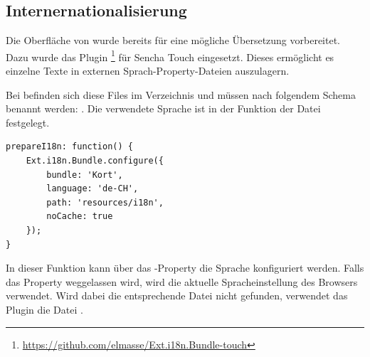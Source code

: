 \subsection{Internernationalisierung}
\label{i18n}
Die Oberfläche von \kort{} wurde bereits für eine mögliche Übersetzung vorbereitet.
Dazu wurde das Plugin \footnote{\url{https://github.com/elmasse/Ext.i18n.Bundle-touch}} für Sencha Touch eingesetzt.
Dieses ermöglicht es einzelne Texte in externen Sprach-Property-Dateien auszulagern.

Bei \kort{} befinden sich diese Files im Verzeichnis  und müssen nach folgendem Schema benannt werden: .
Die verwendete Sprache ist in der Funktion  der Datei  festgelegt.

\lstset{language=JavaScript}
\begin{lstlisting}[caption=kort - Sprache definieren, label=kort-choose-language]
prepareI18n: function() {
	Ext.i18n.Bundle.configure({
		bundle: 'Kort',
		language: 'de-CH',
		path: 'resources/i18n',
		noCache: true
	});
}
\end{lstlisting}

In dieser Funktion kann über das -Property die Sprache konfiguriert werden.
Falls das Property weggelassen wird, wird die aktuelle Spracheinstellung des Browsers verwendet.
Wird dabei die entsprechende Datei nicht gefunden, verwendet das Plugin die Datei .